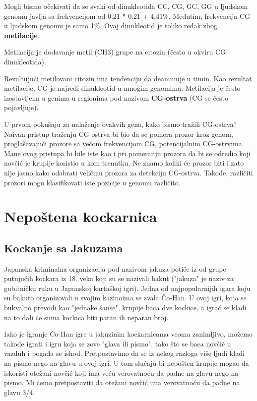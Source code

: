 Mogli bismo očekivati da se svaki od dinukleotida CC, CG, GC, GG u ljudskom genomu javlja sa frekvencijom od 0.21 * 0.21 + 4.41\%. Međutim, frekvencija CG u ljudskom genomu je samo 1\%. Ovaj dinukleotid je toliko redak zbog \textbf{metilacije}.

\begin{definicija}
Metilacija je dodavanje metil (CH3) grupe na citozin (često u okviru CG dinukleotida).
\end{definicija}


Rezultujući metilovani citozin ima tendenciju da deaminuje u timin. Kao rezultat metilacije, CG je najređi dinukleotid u mnogim genomima. Metilacija je često izostavljena u genima u regionima pod nazivom \textbf{CG-ostrva} (CG se često pojavljuje). 

U prvom pokušaju za nalaženje ovakvih gena, kako bismo tražili CG-ostrva? Naivan pristup traženju CG-ostrva bi bio da se pomera prozor kroz genom, proglašavajući prozore sa većom frekvencijom CG, potencijalnim CG-ostrvima. Mane ovog pristupa bi bile iste kao i pri pomeranju prozora da bi se odredio koji novčić je krupije koristio u kom trenutku. Ne znamo koliki će prozor biti i zato nije jasno kako odabrati veličinu prozora za detekciju CG-ostrva. Takođe, različiti prozori mogu klasifikovati iste pozicije u genomu različito.

\section{Nepoštena kockarnica}
\subsection{Kockanje sa Jakuzama}
Japanska kriminalna organizacija pod nazivom jakuza potiče iz od grupe putujućih kockara iz 18. veka koji su se nazivali bakut ("jakuza" je naziv za gubitničku ruku u Japanskoj kartaškoj igri). Jedna od najpopularnijih igara koju su bakuto organizovali u svojim kazinoima se zvala Čo-Han. U ovoj igri, koja se bukvalno prevodi kao "jednake šanse", krupije baca dve kockice, a igrač se kladi na to dali će suma kockica biti paran ili neparan broj.

Iako je igranje Čo-Han igre u jakuzinim kockarnicama veoma zanimljivo, možemo takođe igrati i igru koja se zove "glava ili pismo", tako što se baca novčić u vazduh i pogađa se ishod. Pretpostavimo da se iz nekog razloga više ljudi kladi na pismo nego na glavu u ovoj igri. U tom slučaju bi nepošten krupije mogao da iskoristi otežani novčić koji ima veću verovatnoću da padne na glavu nego na pismo. Mi ćemo pretpostaviti da otežani novčić ima verovatnoću da padne na glavu 3/4.

